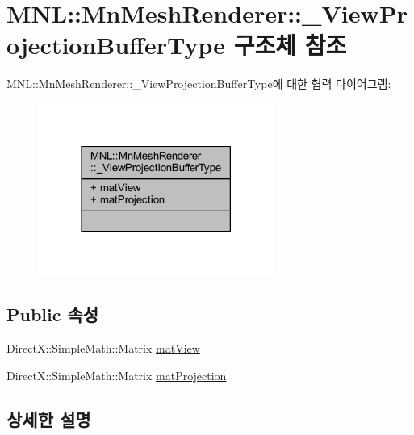 \hypertarget{struct_m_n_l_1_1_mn_mesh_renderer_1_1___view_projection_buffer_type}{}\section{M\+NL\+:\+:Mn\+Mesh\+Renderer\+:\+:\+\_\+\+View\+Projection\+Buffer\+Type 구조체 참조}
\label{struct_m_n_l_1_1_mn_mesh_renderer_1_1___view_projection_buffer_type}


M\+NL\+:\+:Mn\+Mesh\+Renderer\+:\+:\+\_\+\+View\+Projection\+Buffer\+Type에 대한 협력 다이어그램\+:\nopagebreak
\begin{figure}[H]
\begin{center}
\leavevmode
\includegraphics[width=218pt]{struct_m_n_l_1_1_mn_mesh_renderer_1_1___view_projection_buffer_type__coll__graph}
\end{center}
\end{figure}
\subsection*{Public 속성}
\begin{DoxyCompactItemize}
\item 
Direct\+X\+::\+Simple\+Math\+::\+Matrix \hyperlink{struct_m_n_l_1_1_mn_mesh_renderer_1_1___view_projection_buffer_type_af282f99d57500a4dc9e595adcddea495}{mat\+View}
\item 
Direct\+X\+::\+Simple\+Math\+::\+Matrix \hyperlink{struct_m_n_l_1_1_mn_mesh_renderer_1_1___view_projection_buffer_type_acb75b6be61aafc12dc66e68fd4da30ad}{mat\+Projection}
\end{DoxyCompactItemize}


\subsection{상세한 설명}



